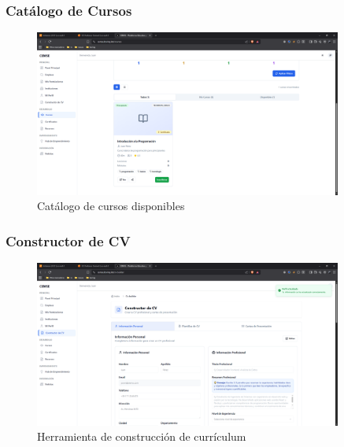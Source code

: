 \documentclass[12pt,a4paper]{article}
\begin{document}
\begin{enumerate}
\subsubsection{Catálogo de Cursos}
\begin{figure}[H]
    \centering
    \includegraphics[width=0.9\textwidth]{screenshots/youth/courses.png}
    \caption{Catálogo de cursos disponibles}
    \label{fig:youth-courses}
\end{figure}

\subsubsection{Constructor de CV}
\begin{figure}[H]
    \centering
    \includegraphics[width=0.9\textwidth]{screenshots/youth/cv-builder.png}
    \caption{Herramienta de construcción de currículum}
    \label{fig:youth-cv-builder}
\end{figure}


\end{enumerate}
\end{document}
